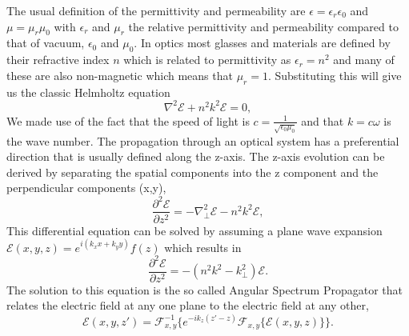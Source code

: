 \documentclass[letterpaper]{ar-1col}
\begin{document}
The usual definition of the permittivity and permeability are $\epsilon=\epsilon_r \epsilon_0$ and $\mu=\mu_r \mu_0$ with $\epsilon_r$ and $\mu_r$ the relative permittivity and permeability compared to that of vacuum, $\epsilon_0$ and $\mu_0$.
%
In optics most glasses and materials are defined by their refractive index $n$ which is related to permittivity as $\epsilon_r = n^2$ and many of these are also non-magnetic which means that $\mu_r=1$.
%
Substituting this will give us the classic Helmholtz equation
\begin{equation}
\nabla^2\mathcal{E} + n^2k^2 \mathcal{E} = 0,
\end{equation}
We made use of the fact that the speed of light is $c = \frac{1}{\sqrt{\epsilon_0\mu_0}}$ and that $k = c\omega$ is the wave number.
%
The propagation through an optical system has a preferential direction that is usually defined along the z-axis.
%
The z-axis evolution can be derived by separating the spatial components into the z component and the perpendicular components (x,y),
\begin{equation}
\frac{\partial^2\mathcal{E}}{\partial z^2} = -\nabla_{\perp}^2\mathcal{E}-n^2k^2 \mathcal{E},
\end{equation}
This differential equation can be solved by assuming a plane wave expansion $\mathcal{E}(x,y,z)=e^{i(k_x x + k_y y)}f(z)$ which results in
\begin{equation}
\frac{\partial^2\mathcal{E}}{\partial z^2} = -(n^2k^2 - k_{\perp}^2)\mathcal{E}.
\end{equation}
The solution to this equation is the so called Angular Spectrum Propagator that relates the electric field at any one plane to the electric field at any other,
\begin{equation}
\label{eq:angular_spectrum}
\mathcal{E}(x, y, z') = \mathcal{F}_{x,y}^{-1}\{e^{-ik_z(z'-z)}\mathcal{F}_{x,y}\{\mathcal{E}(x,y,z)\}\}.
\end{equation}
\end{document}
